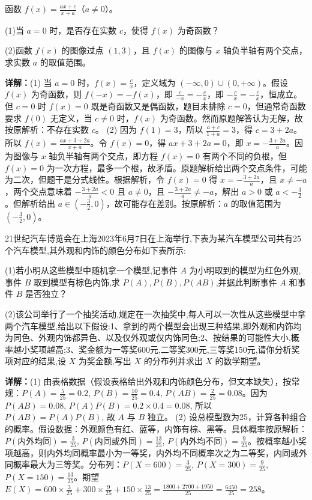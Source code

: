 \begin{question}[points=14]
函数 $f(x)=\frac{ax+c}{x+a}$（$a\neq0$）。

(1)当 $a=0$ 时，是否存在实数 $c$，使得 $f(x)$ 为奇函数？

(2)函数 $f(x)$ 的图像过点 $(1,3)$，且 $f(x)$ 的图像与 $x$ 轴负半轴有两个交点，求实数 $a$ 的取值范围。
\begin{solution}

\textbf{详解：}(1) 当 $a=0$ 时，$f(x)=\frac{c}{x}$，定义域为 $(-\infty,0)\cup(0,+\infty)$。假设 $f(x)$ 为奇函数，则 $f(-x)=-f(x)$，即 $\frac{c}{-x}=-\frac{c}{x}$，即 $-\frac{c}{x}=-\frac{c}{x}$，恒成立。但 $c=0$ 时 $f(x)=0$ 既是奇函数又是偶函数，题目未排除 $c=0$，但通常奇函数要求 $f(0)$ 无定义，当 $c\neq0$ 时，$f(x)$ 为奇函数。然而原题解答认为无解，故按原解析：不存在实数 $c$。
(2) 因为 $f(1)=3$，所以 $\frac{a+c}{1+a}=3$，得 $c=3+2a$。所以 $f(x)=\frac{ax+3+2a}{x+a}$。令 $f(x)=0$，得 $ax+3+2a=0$，即 $x=-\frac{3+2a}{a}$。因为图像与 $x$ 轴负半轴有两个交点，即方程 $f(x)=0$ 有两个不同的负根，但 $f(x)=0$ 为一次方程，最多一个根，故矛盾。原题解析给出两个交点条件，可能为二次，但题干是分式线性。根据解析，令 $f(x)=0$ 得 $x=-\frac{3+2a}{a}$，且 $x\neq -a$，两个交点意味着 $-\frac{3+2a}{a}<0$ 且 $a\neq 0$，且 $-\frac{3+2a}{a}\neq -a$，解出 $a>0$ 或 $a<-\frac{3}{2}$。但解析给出 $a\in(-\frac{3}{2},0)$，故可能存在差别。按原解析：$a$ 的取值范围为 $(-\frac{3}{2},0)$。
\end{solution}
\end{question}

\begin{question}[points=14]
21世纪汽车博览会在上海2023年6月7日在上海举行,下表为某汽车模型公司共有25个汽车模型,其外观和内饰的颜色分布如下表所示:

(1)若小明从这些模型中随机拿一个模型,记事件 $A$ 为小明取到的模型为红色外观,事件 $B$ 取到模型有棕色内饰,求 $P(A),P(B),P(AB)$,并据此判断事件 $A$ 和事件 $B$ 是否独立？

(2)该公司举行了一个抽奖活动,规定在一次抽奖中,每人可以一次性从这些模型中拿两个汽车模型,给出以下假设:1、拿到的两个模型会出现三种结果,即外观和内饰均为同色、外观内饰都异色、以及仅外观或仅内饰同色;2、按结果的可能性大小,概率越小奖项越高;3、奖金额为一等奖600元,二等奖300元,三等奖150元,请你分析奖项对应的结果,设 $X$ 为奖金额,写出 $X$ 的分布列并求出 $X$ 的数学期望。
\begin{solution}

\textbf{详解：}(1) 由表格数据（假设表格给出外观和内饰颜色分布，但文本缺失），按常规：$P(A)=\frac{5}{25}=0.2$, $P(B)=\frac{10}{25}=0.4$, $P(AB)=\frac{2}{25}=0.08$。因为 $P(AB)=0.08$, $P(A)P(B)=0.2\times0.4=0.08$, 所以 $P(AB)=P(A)P(B)$, 故 $A$ 与 $B$ 独立。
(2) 设总模型数为25，计算各种组合的概率。假设数据：外观颜色有红、蓝等，内饰有棕、黑等。具体概率按原解析：$P(\text{内外均同})=\frac{3}{25}$, $P(\text{内同或外同})=\frac{13}{25}$, $P(\text{内外均不同})=\frac{9}{25}$。按概率越小奖项越高，则内外均同概率最小为一等奖，内外均不同概率次之为二等奖，内同或外同概率最大为三等奖。分布列：$P(X=600)=\frac{3}{25}$, $P(X=300)=\frac{9}{25}$, $P(X=150)=\frac{13}{25}$。期望 $E(X)=600\times\frac{3}{25}+300\times\frac{9}{25}+150\times\frac{13}{25}=\frac{1800+2700+1950}{25}=\frac{6450}{25}=258$。
\end{solution}
\end{question}

